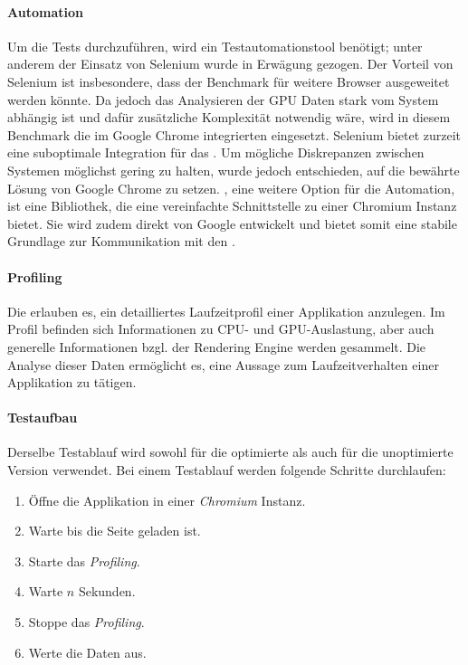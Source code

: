 \paragraph{Automation}
Um die Tests durchzuführen, wird ein Testautomationstool benötigt; unter anderem der Einsatz von Selenium wurde in Erwägung gezogen.
Der Vorteil von Selenium ist insbesondere, dass der Benchmark für weitere Browser ausgeweitet werden könnte.
Da jedoch das Analysieren der GPU Daten stark vom System abhängig ist und dafür zusätzliche Komplexität notwendig wäre, wird in diesem Benchmark die im Google Chrome integrierten  eingesetzt.
Selenium bietet zurzeit eine suboptimale Integration für das .
Um mögliche Diskrepanzen zwischen Systemen möglichst gering zu halten, wurde jedoch entschieden, auf die bewährte Lösung von Google Chrome zu setzen.
, eine weitere Option für die Automation, ist eine Bibliothek, die eine vereinfachte Schnittstelle zu einer Chromium Instanz bietet.
Sie wird zudem direkt von Google entwickelt und bietet somit eine stabile Grundlage zur Kommunikation mit den .

\paragraph{Profiling}
Die  erlauben es, ein detailliertes Laufzeitprofil einer Applikation anzulegen.
Im Profil befinden sich Informationen zu CPU- und GPU-Auslastung, aber auch generelle Informationen bzgl. der \gls{Rendering Engine} werden gesammelt.
Die Analyse dieser Daten ermöglicht es, eine Aussage zum Laufzeitverhalten einer Applikation zu tätigen.

\paragraph{Testaufbau}
Derselbe Testablauf wird sowohl für die optimierte als auch für die unoptimierte Version verwendet.
Bei einem Testablauf werden folgende Schritte durchlaufen:

\begin{enumerate}
  \item Öffne die Applikation in einer \emph{Chromium} Instanz.
  \item Warte bis die Seite geladen ist.
  \item Starte das \emph{Profiling}.
  \item Warte $n$ Sekunden.
  \item Stoppe das \emph{Profiling}.
  \item Werte die Daten aus.
\end{enumerate}

